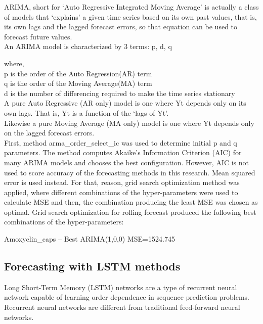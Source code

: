 \documentclass[12pt]{report}
\begin{document}
ARIMA, short for ‘Auto Regressive Integrated Moving Average’ is actually a class of models that ‘explains’ a given time series based on its own past values, that is, its own lags and the lagged forecast errors, so that equation can be used to forecast future values.\\

An ARIMA model is characterized by 3 terms: p, d, q

where,\\

p is the order of the Auto Regression(AR) term\\

q is the order of the Moving Average(MA) term\\

d is the number of differencing required to make the time series stationary\\


A pure Auto Regressive (AR only) model is one where Yt depends only on its own lags. That is, Yt is a function of the ‘lags of Yt’.\\

Likewise a pure Moving Average (MA only) model is one where Yt depends only on the lagged forecast errors.\\


 First, method arma\_order\_select\_ic was used to determine initial p and q parameters. The method computes Akaike’s Information Criterion (AIC) for many ARIMA models and chooses the best configuration. However, AIC is not used to score accuracy of the forecasting methods in this research. Mean squared error is used instead. For that, reason, grid search optimization method was applied, where different combinations of the hyper-parameters were used to calculate MSE and then, the combination producing the least MSE was chosen as optimal. Grid search optimization for rolling forecast produced the following best combinations of the hyper-parameters:
 
Amoxyclin\_caps – Best ARIMA(1,0,0) MSE=1524.745


\subsection{Forecasting with LSTM methods}
Long Short-Term Memory (LSTM) networks are a type of recurrent neural network capable of learning order dependence in sequence prediction problems.\\
Recurrent neural networks are different from traditional feed-forward neural networks.
\end{document}
